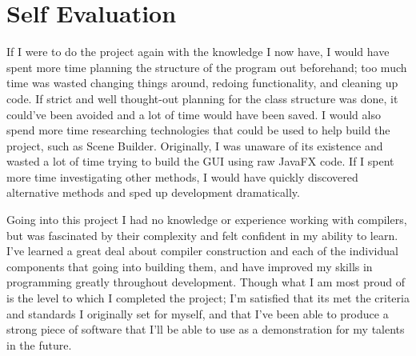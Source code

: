 \documentclass[
]{report}
\begin{document}
\section{Self Evaluation}
If I were to do the project again with the knowledge I now have, I would
have spent more time planning the structure of the program out
beforehand; too much time was wasted changing things around, redoing
functionality, and cleaning up code. If strict and well thought-out
planning for the class structure was done, it could've been avoided and
a lot of time would have been saved. I would also spend more time
researching technologies that could be used to help build the project,
such as Scene Builder. Originally, I was unaware of its existence and
wasted a lot of time trying to build the GUI using raw JavaFX code. If I
spent more time investigating other methods, I would have quickly
discovered alternative methods and sped up development dramatically.

Going into this project I had no knowledge or experience working with
compilers, but was fascinated by their complexity and felt confident in
my ability to learn. I've learned a great deal about compiler
construction and each of the individual components that going into
building them, and have improved my skills in programming greatly
throughout development. Though what I am most proud of is the level to
which I completed the project; I'm satisfied that its met the criteria
and standards I originally set for myself, and that I've been able to
produce a strong piece of software that I'll be able to use as a
demonstration for my talents in the future.
\end{document}
